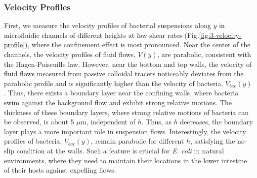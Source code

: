 \subsubsection{Velocity Profiles}
First, we measure the velocity profiles of bacterial suspensions along $y$ in microfluidic channels of different heights at low shear rates (Fig.\ref{fig:3-velocity-profile}), where the confinement effect is most pronounced. Near the center of the channels, the velocity profiles of fluid flows, $V(y)$, are parabolic, consistent with the Hagen-Poiseuille law. However, near the bottom and top walls, the velocity of fluid flows measured from passive colloidal tracers noticeably deviates from the parabolic profile and is significantly higher than the velocity of bacteria, $V_{bac}(y)$. Thus, there exists a boundary layer near the confining walls, where bacteria swim against the background flow and exhibit strong relative motions. The thickness of these boundary layers, where strong relative motions of bacteria can be observed, is about 5 $\mu$m, independent of $h$. Thus, as $h$ decreases, the boundary layer plays a more important role in suspension flows. Interestingly, the velocity profiles of bacteria, $V_{bac}(y)$, remain parabolic for different $h$, satisfying the no-slip condition at the walls. Such a feature is
crucial for \textit{E. coli} in natural environments, where they need to maintain their locations in the lower intestine of their hosts against expelling flows.

